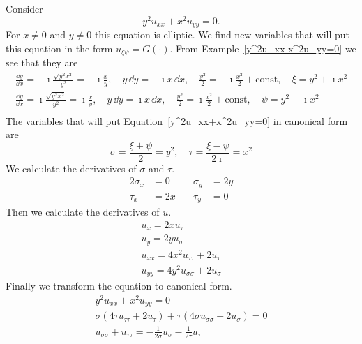 \begin{Example}
  Consider
  \begin{equation}
    \label{y^2u_xx+x^2u_yy=0}
    y^2 u_{x x} + x^2 u_{y y} = 0.
  \end{equation}
  For $x \neq 0$ and $y \neq 0$ this equation is elliptic.
  We find new variables that will put this equation in the form
  $u_{\xi \psi} = G(\cdot)$.  From Example~\ref{y^2u_xx-x^2u_yy=0}
  we see that they are
  \begin{gather*}
    \frac{\dd y}{\dd x} = - \imath \frac{\sqrt{ y^2 x^2 }}{y^2} 
    = - \imath \frac{x}{y}, \quad 
    y \,\dd y = - \imath x \,\dd x, \quad
    \frac{y^2}{2} = - \imath \frac{x^2}{2} + \mathrm{const}, \quad
    \xi = y^2 + \imath x^2 
    \\
    \frac{\dd y}{\dd x} = \imath \frac{\sqrt{ y^2 x^2 }}{y^2} = \imath \frac{x}{y}, \quad 
    y \,\dd y = \imath x \,\dd x, \quad
    \frac{y^2}{2} = \imath \frac{x^2}{2} + \mathrm{const}, \quad
    \psi = y^2 - \imath x^2 \\
  \end{gather*}
  The variables that will put Equation~\ref{y^2u_xx+x^2u_yy=0} in 
  canonical form are
  \[
  \sigma = \frac{\xi + \psi}{2} = y^2, \quad
  \tau = \frac{\xi - \psi}{2 \imath} = x^2
  \]
  We calculate the derivatives of $\sigma$ and $\tau$.
  \begin{alignat*}{2}
    \sigma_x &= 0 &\quad \sigma_y &= 2 y 
    \\
    \tau_x &= 2 x  &\quad \tau_y &= 0
  \end{alignat*}
  Then we calculate the derivatives of $u$.
  \begin{gather*}
    u_x = 2 x u_\tau 
    \\
    u_y = 2 y u_\sigma 
    \\
    u_{x x} = 4 x^2 u_{\tau \tau} + 2 u_\tau 
    \\
    u_{y y} = 4 y^2 u_{\sigma \sigma} + 2 u_\sigma
  \end{gather*}
  Finally we transform the equation to canonical form.
  \begin{gather*}
    y^2 u_{x x} + x^2 u_{y y} = 0 
    \\
    \sigma ( 4 \tau u_{\tau \tau} + 2 u_\tau ) + \tau ( 4 \sigma u_{\sigma \sigma} + 2 u_\sigma ) = 0 
    \\
    \boxed{
      u_{\sigma \sigma} + u_{\tau \tau} = - \frac{1}{2 \sigma} u_\sigma - \frac{1}{2 \tau} u_{\tau}
      }
  \end{gather*}
\end{Example}















